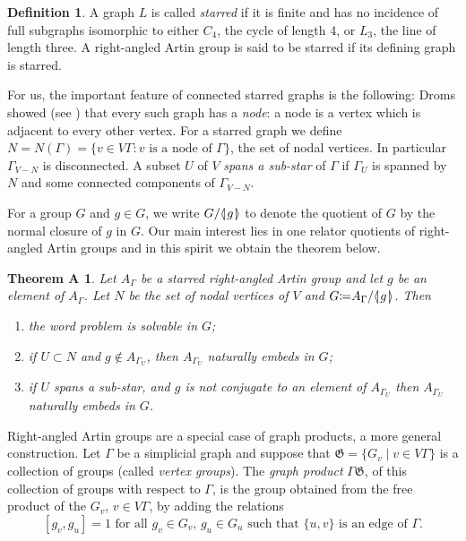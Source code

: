 \documentclass[12pt, a4paper]{amsart}
\newtheorem*{ThmA}{Theorem A}
\theoremstyle{remark}
\theoremstyle{definition}
\newtheorem{Def}[Thm]{Definition}
\begin{document}
\begin{Def}\label{Def:star} A graph $L$ is called {\it starred } if it is finite and has no incidence of full subgraphs isomorphic to either $C_4$, the cycle of length 4, or $L_3$, the line of length three. A right-angled Artin group is said to be starred if its defining graph is starred. 
\end{Def}

\noindent For us, the important feature of connected starred graphs is the following: Droms showed (see \cite[Lemma]{Droms}) that every such graph has a {\it node}: a node is a vertex which is adjacent to every other vertex. 
For a starred graph we define $N=N({\Gamma})=\{v\in V{\Gamma} : v \text{ is a node of } {\Gamma}\}$, the set of nodal vertices. In particular ${\Gamma}_{V-N}$ is disconnected. A subset $U$ of $V$ {\it spans a sub-star} of ${\Gamma}$ if ${\Gamma}_U$ is spanned by $N$ and some connected components of ${\Gamma}_{V-N}$.

For a group $G$ and $g\in G$, we write $G/{{\langle}{\mkern-3.7mu}{\lvert}{\mkern1.2mu}{{g}}{\mkern1.2mu}{\rvert}{\mkern-3.7mu}{\rangle}}$ to denote the quotient of $G$ by the normal closure of $g$ in $G$. Our main interest lies in one relator quotients of right-angled Artin groups and in this spirit we obtain the theorem below.

\begin{ThmA} Let $A_\Gamma$ be a starred right-angled Artin group and let $g$ be an element of $A_\Gamma$. Let $N$ be the set of nodal vertices of $V$ and $G{\mathrel{\mathop\mathchar"303A}\mkern-1.2mu=} A_\Gamma/{{{\langle}{\mkern-3.7mu}{\lvert}{\mkern1.2mu}{{g}}{\mkern1.2mu}{\rvert}{\mkern-3.7mu}{\rangle}}}$. Then
\begin{enumerate}
\item[(i)] the word problem is solvable in $G$;
\item[(ii)] if $U\subset N$ and $g\not\in A_{{\Gamma}_U}$, then $A_{{\Gamma}_U}$ naturally embeds in $G$;
\item[(iii)] if $U$ spans a sub-star, and $g$ is not conjugate to an element of $A_{{\Gamma}_U}$ then $A_{{\Gamma}_U}$ naturally embeds in $G$.
\end{enumerate}
\end{ThmA} 

Right-angled Artin groups are  a special case of graph products, a more general construction. Let ${\Gamma}$ be a simplicial graph and suppose that $\mathfrak{G}=\{G_v \mid v\in V{\Gamma}\}$ is a collection of groups (called \textit{vertex groups}). The \emph{graph product} ${\Gamma} \mathfrak{G}$, of this collection of groups with respect to ${\Gamma}$, is the group obtained from the free product of the $G_v$, $v \in V{\Gamma}$, by adding the relations $$[g_v, g_u]=1  \text{ for all }  g_v\in G_v,\, g_u\in G_u \text{ such that $\{u,v\}$ is an edge of } {\Gamma}.$$
\end{document}
